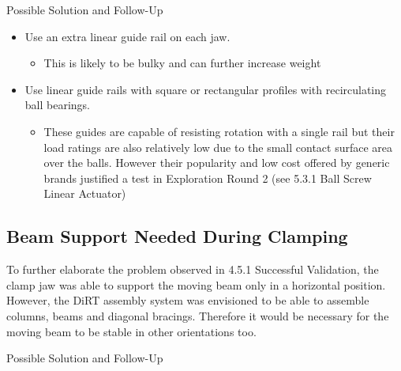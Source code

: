 Possible Solution and Follow-Up
\begin{itemize}
    \item Use an extra linear guide rail on each jaw.
    \begin{itemize}
        \item This is likely to be bulky and can further increase weight
    \end{itemize}
    \item Use linear guide rails with square or rectangular profiles with recirculating ball bearings.
    \begin{itemize}
        \item These guides are capable of resisting rotation with a single rail but their load ratings are also relatively low due to the small contact surface area over the balls. However their popularity and low cost offered by generic brands justified a test in Exploration Round 2 (see 5.3.1 Ball Screw Linear Actuator)
    \end{itemize}
\end{itemize}
        
\subsection{Beam Support Needed During Clamping}
\label{subsection:exploration_1_beam_support_needed_during_clamping}

To further elaborate the problem observed in 4.5.1 Successful Validation, the clamp jaw was able to support the moving beam only in a horizontal position. However, the DiRT assembly system was envisioned to be able to assemble columns, beams and diagonal bracings. Therefore it would be necessary for the moving beam to be stable in other orientations too.

Possible Solution and Follow-Up

